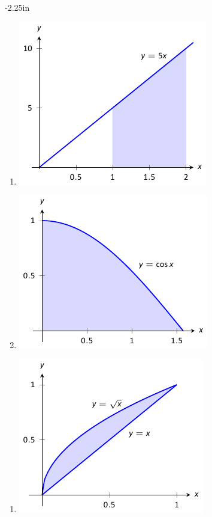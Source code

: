 \begin{adjustwidth*}{}{-2.25in}
\begin{multicols*}{2}
\begin{enumerate}[1),resume]
\item \begin{minipage}{\linewidth}\centering\includegraphics{figures/fig07_02_ex_06}\end{minipage}

\item \begin{minipage}{\linewidth}\centering\includegraphics{figures/fig07_02_ex_07}\end{minipage}
\end{enumerate}


\begin{enumerate}[1),resume]
\item \begin{minipage}{\linewidth}\centering\includegraphics{figures/fig07_02_ex_08}\end{minipage}


\end{enumerate}
\end{multicols*}
\end{adjustwidth*}
